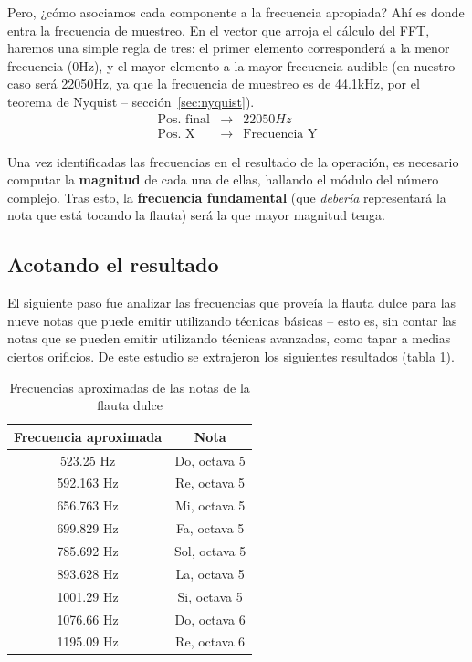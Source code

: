Pero, ¿cómo asociamos cada componente a la frecuencia apropiada? Ahí es donde
entra la frecuencia de muestreo. En el vector que arroja el cálculo del FFT,
haremos una simple regla de tres: el primer elemento corresponderá a la menor
frecuencia (0Hz), y el mayor elemento a la mayor frecuencia audible (en nuestro
caso será 22050Hz, ya que la frecuencia de muestreo es de 44.1kHz, por el
teorema de Nyquist -- sección~\ref{sec:nyquist}).
$$
   \begin{array}{ccc}
       \textrm{Pos. final}  & \longrightarrow & 22050Hz\\
       \textrm{Pos. X} & \longrightarrow & \textrm{Frecuencia Y}
   \end{array}
$$

Una vez identificadas las frecuencias en el resultado de la operación, es
necesario computar la \textbf{magnitud} de cada una de ellas, hallando el módulo
del número complejo. Tras esto, la \textbf{frecuencia fundamental} (que
\textit{debería} representará la nota que está tocando la flauta) será la que
mayor magnitud tenga.

\subsection{Acotando el resultado}
El siguiente paso fue analizar las frecuencias que proveía la flauta dulce para
las nueve notas que puede emitir utilizando técnicas básicas -- esto es, sin
contar las notas que se pueden emitir utilizando técnicas avanzadas, como tapar
a medias ciertos orificios. De este estudio se extrajeron los siguientes
resultados (tabla \ref{tab:frecuencias}).

\begin{table}[ht!]
  \centering
  \begin{tabular}[h]{|c|c|}
    \hline
    \textbf{Frecuencia aproximada} & \textbf{Nota} \\ \hline
    523.25 Hz & Do, octava 5\\ \hline
    592.163 Hz & Re, octava 5\\ \hline
    656.763 Hz & Mi, octava 5\\ \hline
    699.829 Hz & Fa, octava 5\\ \hline
    785.692 Hz & Sol, octava 5\\ \hline
    893.628 Hz & La, octava 5\\ \hline
    1001.29 Hz & Si, octava 5\\ \hline
    1076.66 Hz & Do, octava 6 \\ \hline
    1195.09 Hz & Re, octava 6 \\ \hline
  \end{tabular}
  \caption{Frecuencias aproximadas de las notas de la flauta dulce}
  \label{tab:frecuencias}
\end{table}

